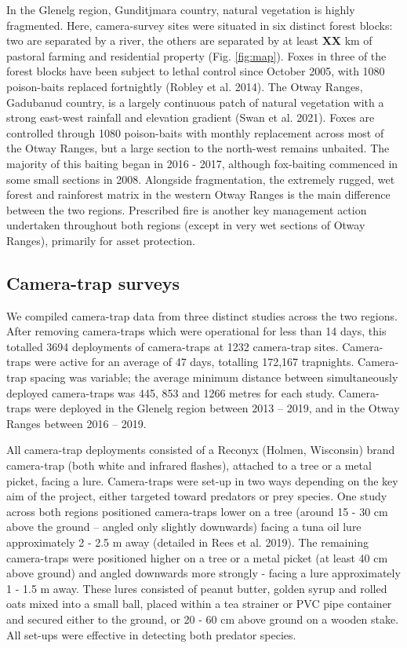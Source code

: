 \documentclass[]{elsarticle} %
\begin{document}
In the Glenelg region, Gunditjmara country, natural vegetation is highly fragmented. Here, camera-survey sites were situated in six distinct forest blocks: two are separated by a river, the others are separated by at least \textbf{XX} km of pastoral farming and residential property (Fig. \ref{fig:map}). Foxes in three of the forest blocks have been subject to lethal control since October 2005, with 1080 poison-baits replaced fortnightly (Robley et al. 2014). The Otway Ranges, Gadubanud country, is a largely continuous patch of natural vegetation with a strong east-west rainfall and elevation gradient (Swan et al. 2021). Foxes are controlled through 1080 poison-baits with monthly replacement across most of the Otway Ranges, but a large section to the north-west remains unbaited. The majority of this baiting began in 2016 - 2017, although fox-baiting commenced in some small sections in 2008. Alongside fragmentation, the extremely rugged, wet forest and rainforest matrix in the western Otway Ranges is the main difference between the two regions. Prescribed fire is another key management action undertaken throughout both regions (except in very wet sections of Otway Ranges), primarily for asset protection.

\hypertarget{camera-trap-surveys}{%
\subsection{Camera-trap surveys}\label{camera-trap-surveys}}

We compiled camera-trap data from three distinct studies across the two regions. After removing camera-traps which were operational for less than 14 days, this totalled 3694 deployments of camera-traps at 1232 camera-trap sites. Camera-traps were active for an average of 47 days, totalling 172,167 trapnights. Camera-trap spacing was variable; the average minimum distance between simultaneously deployed camera-traps was 445, 853 and 1266 metres for each study. Camera-traps were deployed in the Glenelg region between 2013 -- 2019, and in the Otway Ranges between 2016 -- 2019.

All camera-trap deployments consisted of a Reconyx (Holmen, Wisconsin) brand camera-trap (both white and infrared flashes), attached to a tree or a metal picket, facing a lure. Camera-traps were set-up in two ways depending on the key aim of the project, either targeted toward predators or prey species. One study across both regions positioned camera-traps lower on a tree (around 15 - 30 cm above the ground -- angled only slightly downwards) facing a tuna oil lure approximately 2 - 2.5 m away (detailed in Rees et al. 2019). The remaining camera-traps were positioned higher on a tree or a metal picket (at least 40 cm above ground) and angled downwards more strongly - facing a lure approximately 1 - 1.5 m away. These lures consisted of peanut butter, golden syrup and rolled oats mixed into a small ball, placed within a tea strainer or PVC pipe container and secured either to the ground, or 20 - 60 cm above ground on a wooden stake. All set-ups were effective in detecting both predator species.
\end{document}
